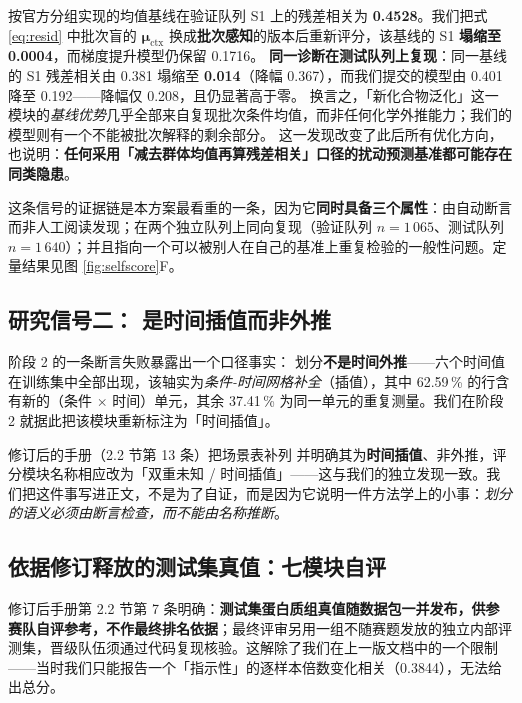 \begin{keybox}[title=一个由探索环境自己发现的口径隐患]
\small
按官方分组实现的均值基线在验证队列 S1 上的残差相关为 \textbf{0.4528}。我们把式 \eqref{eq:resid} 中批次盲的 $\bm{\mu}_{\text{ctx}}$ 换成\textbf{批次感知}的版本后重新评分，该基线的 S1 \textbf{塌缩至 0.0004}，而梯度提升模型仍保留 0.1716。
\NEW{}\textbf{同一诊断在测试队列上复现}：同一基线的 S1 残差相关由 0.381 塌缩至 \textbf{0.014}（降幅 0.367），而我们提交的模型由 0.401 降至 0.192——降幅仅 0.208，且仍显著高于零。
换言之，「新化合物泛化」这一模块的\emph{基线优势}几乎全部来自复现批次条件均值，而非任何化学外推能力；我们的模型则有一个不能被批次解释的剩余部分。
这一发现改变了此后所有优化方向，也说明：\textbf{任何采用「减去群体均值再算残差相关」口径的扰动预测基准都可能存在同类隐患}。
\end{keybox}

这条信号的证据链是本方案最看重的一条，因为它\textbf{同时具备三个属性}：由自动断言而非人工阅读发现；在两个独立队列上同向复现（验证队列 $n=1\,065$、测试队列 $n=1\,640$）；并且指向一个可以被别人在自己的基准上重复检验的一般性问题。定量结果见图 \ref{fig:selfscore}F。

\subsection{研究信号二： 是时间插值而非外推}
\label{sec:timeinterp}

阶段 2 的一条断言失败暴露出一个口径事实： 划分\textbf{不是时间外推}——六个时间值在训练集中全部出现，该轴实为\emph{条件-时间网格补全}（插值），其中 62.59\,\% 的行含有新的（条件 $\times$ 时间）单元，其余 37.41\,\% 为同一单元的重复测量。我们在阶段 2 就据此把该模块重新标注为「时间插值」。

修订后的手册（2.2 节第 13 条）把场景表补列  并明确其为\textbf{时间插值}、非外推，评分模块名称相应改为「双重未知 / 时间插值」——这与我们的独立发现一致。我们把这件事写进正文，不是为了自证，而是因为它说明一件方法学上的小事：\emph{划分的语义必须由断言检查，而不能由名称推断}。

\subsection{\NEW{}依据修订释放的测试集真值：七模块自评}
\label{sec:selfscore}

修订后手册第 2.2 节第 7 条明确：\textbf{测试集蛋白质组真值随数据包一并发布，供参赛队自评参考，不作最终排名依据}；最终评审另用一组不随赛题发放的独立内部评测集，晋级队伍须通过代码复现核验。这解除了我们在上一版文档中的一个限制——当时我们只能报告一个「指示性」的逐样本倍数变化相关（0.3844），无法给出总分。

